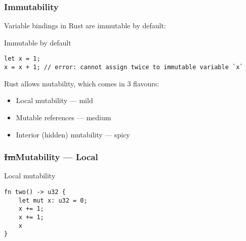 \documentclass[t]{beamer}
\begin{document}
\begin{frame}[c,fragile]
\begin{center}
\end{center}
\end{frame}


\begin{frame}[fragile]
\frametitle{Immutability}

Variable bindings in Rust are immutable by default:

\begin{block}{Immutable by default}
\small
\begin{verbatim}
let x = 1;
x = x + 1; // error: cannot assign twice to immutable variable `x`
\end{verbatim}
\end{block}

\bigskip

Rust allows mutability, which comes in 3 flavours:

\begin{itemize}
\item Local mutability --- mild
\item Mutable references --- medium
\item Interior (hidden) mutability --- spicy
\end{itemize}
\end{frame}


\begin{frame}[c,fragile]
\frametitle{\st{Im}Mutability --- Local}

\begin{block}{Local mutability}
\begin{verbatim}
fn two() -> u32 {
    let mut x: u32 = 0;
    x += 1;
    x += 1;
    x
}
\end{verbatim}
\end{block}

\end{frame}
\end{document}
